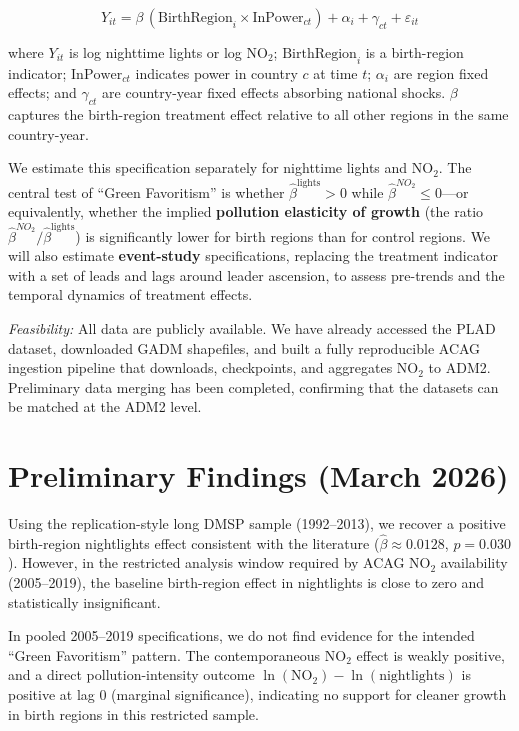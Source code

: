 \documentclass[12pt]{article}
\begin{document}
\[
Y_{it} = \beta \, (\text{BirthRegion}_{i} \times \text{InPower}_{ct}) + \alpha_i + \gamma_{ct} + \varepsilon_{it}
\]

where $Y_{it}$ is log nighttime lights or log NO$_2$; $\text{BirthRegion}_{i}$ is a birth-region indicator; $\text{InPower}_{ct}$ indicates power in country $c$ at time $t$; $\alpha_i$ are region fixed effects; and $\gamma_{ct}$ are country-year fixed effects absorbing national shocks. $\beta$ captures the birth-region treatment effect relative to all other regions in the same country-year.

We estimate this specification separately for nighttime lights and NO$_2$. The central test of ``Green Favoritism'' is whether $\hat{\beta}^{\text{lights}} > 0$ while $\hat{\beta}^{NO_2} \leq 0$---or equivalently, whether the implied \textbf{pollution elasticity of growth} (the ratio $\hat{\beta}^{NO_2} / \hat{\beta}^{\text{lights}}$) is significantly lower for birth regions than for control regions. We will also estimate \textbf{event-study} specifications, replacing the treatment indicator with a set of leads and lags around leader ascension, to assess pre-trends and the temporal dynamics of treatment effects.

\textit{Feasibility:} All data are publicly available. We have already accessed the PLAD dataset, downloaded GADM shapefiles, and built a fully reproducible ACAG ingestion pipeline that downloads, checkpoints, and aggregates NO$_2$ to ADM2. Preliminary data merging has been completed, confirming that the datasets can be matched at the ADM2 level.

\section*{Preliminary Findings (March 2026)}

Using the replication-style long DMSP sample (1992--2013), we recover a positive birth-region nightlights effect consistent with the literature ($\hat{\beta}\approx0.0128$, $p=0.030$). However, in the restricted analysis window required by ACAG NO$_2$ availability (2005--2019), the baseline birth-region effect in nightlights is close to zero and statistically insignificant.

In pooled 2005--2019 specifications, we do not find evidence for the intended ``Green Favoritism'' pattern. The contemporaneous NO$_2$ effect is weakly positive, and a direct pollution-intensity outcome $\ln(\text{NO}_2)-\ln(\text{nightlights})$ is positive at lag 0 (marginal significance), indicating no support for cleaner growth in birth regions in this restricted sample.
\end{document}

